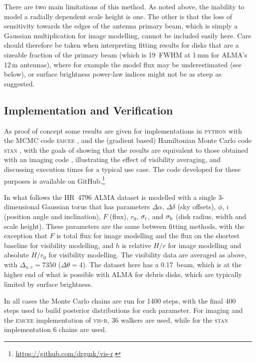 \documentclass[fleqn,usenatbib]{mnras}
\begin{document}
There are two main limitations of this method. As noted above, the inability to model a radially dependent scale height is one. The other is that the loss of sensitivity towards the edges of the antenna primary beam, which is simply a Gaussian multiplication for image modelling, cannot be included easily here. Care should therefore be taken when interpreting fitting results for disks that are a sizeable fraction of the primary beam (which is 19\arcsec~FWHM at 1\,mm for ALMA's 12\,m antennas), where for example the model flux may be underestimated (see below), or surface brightness power-law indices might not be as steep as suggested.

\subsection{ Implementation and Verification}

As proof of concept some results are given for implementations in \textsc{python} with the MCMC code \textsc{emcee} \citep{2013PASP..125..306F}, and the (gradient based) Hamiltonian Monte Carlo code \textsc{stan} \citep{2017JSS....76....1C}, with the goals of showing that the results are equivalent to those obtained with an imaging code \citep[e.g.][]{2021MNRAS.504.4497C}, illustrating the effect of visibility averaging, and discussing execution times for a typical use case. The code developed for these purposes is available on GitHub.\footnote{\href{https://github.com/drgmk/vis-r}{https://github.com/drgmk/vis-r}.}

In what follows the HR~4796 ALMA dataset is modelled with a single 3-dimensional Gaussian torus that has parameters $\Delta \alpha$, $\Delta \delta$ (sky offsets), $\phi$, $i$ (position angle and inclination), $F$ (flux), $r_0$, $\sigma_{\rm r}$, and $\sigma_{\rm h}$ (disk radius, width and scale height). These parameters are the same between fitting methods, with the exception that $F$ is total flux for image modelling and the flux on the shortest baseline for visibility modelling, and $h$ is relative $H/r$ for image modelling and absolute $H/r_0$ for visibility modelling. The visibility data are averaged as above, with $\Delta_{u,v} = 7350$ ($\Delta \theta = 4$). The dataset here has a 0.17\arcsec~beam, which is at the higher end of what is possible with ALMA for debris disks, which are typically limited by surface brightness.

In all cases the Monte Carlo chains are run for 1400 steps, with the final 400 steps used to build posterior distributions for each parameter. For imaging and the \textsc{emcee} implementation of \textsc{vis-r}, 36 walkers are used, while for the \textsc{stan} implementation 6 chains are used.
\end{document}
